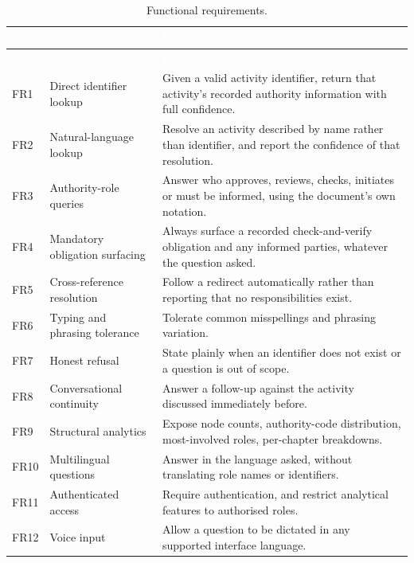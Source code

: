 \begin{longtable}{|p{}|p{}|p{}|}
\caption{Functional requirements.}\label{tab:fr}\\
\hline
\rowcolor{myblue}\textcolor{white}{\textbf{Ref.}} & \textcolor{white}{\textbf{Requirement}} & \textcolor{white}{\textbf{Description}} \\
\hline
\endfirsthead
\hline
\rowcolor{myblue}\textcolor{white}{\textbf{Ref.}} & \textcolor{white}{\textbf{Requirement}} & \textcolor{white}{\textbf{Description}} \\
\hline
\endhead
FR1 & Direct identifier lookup & Given a valid activity identifier, return that activity's recorded authority information with full confidence. \\ \hline
FR2 & Natural-language lookup & Resolve an activity described by name rather than identifier, and report the confidence of that resolution. \\ \hline
FR3 & Authority-role queries & Answer who approves, reviews, checks, initiates or must be informed, using the document's own notation. \\ \hline
FR4 & Mandatory obligation surfacing & Always surface a recorded check-and-verify obligation and any informed parties, whatever the question asked. \\ \hline
FR5 & Cross-reference resolution & Follow a redirect automatically rather than reporting that no responsibilities exist. \\ \hline
FR6 & Typing and phrasing tolerance & Tolerate common misspellings and phrasing variation. \\ \hline
FR7 & Honest refusal & State plainly when an identifier does not exist or a question is out of scope. \\ \hline
FR8 & Conversational continuity & Answer a follow-up against the activity discussed immediately before. \\ \hline
FR9 & Structural analytics & Expose node counts, authority-code distribution, most-involved roles, per-chapter breakdowns. \\ \hline
FR10 & Multilingual questions & Answer in the language asked, without translating role names or identifiers. \\ \hline
FR11 & Authenticated access & Require authentication, and restrict analytical features to authorised roles. \\ \hline
FR12 & Voice input & Allow a question to be dictated in any supported interface language. \\ \hline

\end{longtable}
